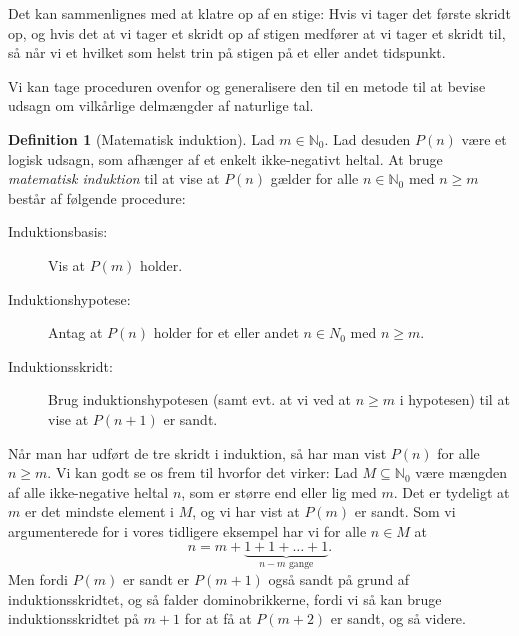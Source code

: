 \documentclass[a4paper, 12pt]{article}
\numberwithin{equation}{section}
\theoremstyle{plain}
\theoremstyle{definition}
\newtheorem{definition}[saetning]{Definition}
\newcommand{\N}{\mathbb{N}}
\begin{document}
      Det kan sammenlignes med at klatre op af en stige: Hvis vi tager det første skridt op, og hvis det at vi tager et skridt op af stigen medfører at vi tager et skridt til, så når vi et hvilket som helst trin på stigen på et eller andet tidspunkt.

      Vi kan tage proceduren ovenfor og generalisere den til en metode til at bevise udsagn om vilkårlige delmængder af naturlige tal.
\begin{definition}[Matematisk induktion]
  Lad \(m\in\N_0\). Lad desuden \(P(n)\) være et logisk udsagn, som afhænger af et enkelt ikke-negativt heltal. At bruge \emph{matematisk induktion} til at vise at \(P(n)\) gælder for alle \(n\in\N_0\) med \(n\ge m\) består af følgende procedure:
  \begin{description}
  \item[Induktionsbasis:] Vis at \(P(m)\) holder.
  \item[Induktionshypotese:] Antag at \(P(n)\) holder for et eller andet \(n\in N_0\) med \(n\ge m\).
    \item[Induktionsskridt:] Brug induktionshypotesen (samt evt. at vi ved at \(n\ge m\) i hypotesen) til at vise at \(P(n+1)\) er sandt.
  \end{description}
\end{definition}
Når man har udført de tre skridt i induktion, så har man vist \(P(n)\) for alle \(n\ge m\). Vi kan godt se os frem til hvorfor det virker: Lad \(M\subseteq \N_0\) være mængden af alle ikke-negative heltal \(n\), som er større end eller lig med \(m\). Det er tydeligt at \(m\) er det mindste element i \(M\), og vi har vist at \(P(m)\) er sandt. Som vi argumenterede for i vores tidligere eksempel har vi for alle \(n\in M\) at
\[
  n=m+\underbrace{1+1+\ldots+1}_{n-m\text{ gange}}.
\]
Men fordi \(P(m)\) er sandt er \(P(m+1)\) også sandt på grund af induktionsskridtet, og så falder dominobrikkerne, fordi vi så kan bruge induktionsskridtet på \(m+1\) for at få at \(P(m+2)\) er sandt, og så videre.
\end{document}
